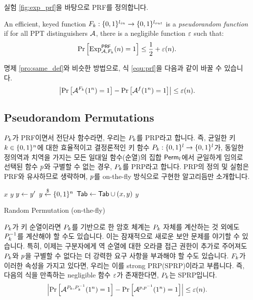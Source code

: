 실험 \ref{fig:exp_prf}을 바탕으로 PRF를 정의합니다.

\begin{definition} \label{def:prf}
  An efficient, keyed function
  $F_{k}: \{0, 1\}^{l_{in}} \to \{0, 1\}^{l_{out}}$ is a \emph{pseudorandom function} 
  if for all PPT distinguishers $\mathcal{A}$, there is a negligible function $\varepsilon$ 
  such that:
  \begin{equation}
    \text{Pr} \left[ \text{Exp}_{\mathcal{A}, F_{k}}^{\textsf{PRF}}(n) = 1 \right] \le \frac{1}{2} + \varepsilon(n).
    \label{equ:prf}
  \end{equation}
\end{definition}

명제 \ref{pro:same_def}와 비슷한 방법으로, 식 \ref{equ:prf}을 다음과 같이 바꿀 수 있습니다.
\begin{equation}
  \left| \text{Pr} \left[ \mathcal{A}^{F_{k}}(1^n) = 1 \right] - \text{Pr} \left[ \mathcal{A}^{f}(1^n) = 1 \right] \right| \le \varepsilon(n).
  \label{equ:prf2}
\end{equation}

\subsection*{Pseudorandom Permutations}
$P_{k}$가 PRF이면서 전단사 함수라면, 우리는 $P_{k}$를 PRP라고 합니다. 즉, 균일한 키 
$k \in \{0, 1\}^{n}$에 대한 효율적이고 결정론적인 키 함수 
$P_{k}: \{0, 1\}^{l} \to \{0, 1\}^{l}$가, 동일한 정의역과 치역을 가지는 모든 일대일
함수(순열)의 집합 $\textsf{Perm}_l$에서 균일하게 임의로 선택된 함수 $p$와 구별할 수 없는 경우, 
$P_{k}$를 PRP라고 합니다. PRP의 정의 및 실험은 PRF와 유사하므로 생략하며, $p$를 on-the-fly 
방식으로 구현한 알고리듬만 소개합니다.
\begin{algorithm}
  \begin{algorithmic}[1]
    \Require $x$
    \Ensure $y$
    \State $y \leftarrow y'$
    \State $y \overset{\$}\leftarrow \{0, 1\}^{n}$
    \EndWhile
    \State $\textsf{Tab} \leftarrow \textsf{Tab} \cup (x, y)$
    \EndIf
    \State \Return $y$
    \EndProcedure
  \end{algorithmic}
  \caption{Random Permutation (on-the-fly)}
  \label{alg:rp}
\end{algorithm}

$P_{k}$가 키 순열이라면 $P_{k}$를 기반으로 한 암호 체계는 $P_{k}$ 자체를 계산하는 것 외에도 
$P^{-1}_{k}$를 계산해야 할 수도 있습니다. 이는 잠재적으로 새로운 보안 문제를 야기할 수 있습니다. 
특히, 이제는 구분자에게 역 순열에 대한 오라클 접근 권한이 추가로 주어져도 $P_{k}$와 $p$을 구별할 수 
없다는 더 강력한 요구 사항을 부과해야 할 수도 있습니다. $F_{k}$가 이러한 속성을 가지고 있다면, 우리는 
이를 strong PRP(SPRP)이라고 부릅니다. 즉, 다음의 식을 만족하는 negligible 함수 $\varepsilon$가 
존재한다면, $P_{k}$는 SPRP입니다.
\begin{equation}
  \left| \text{Pr} \left[ \mathcal{A}^{P_{k}, P^{-1}_{k}}(1^n) = 1 \right] - \text{Pr} \left[ \mathcal{A}^{p, p^{-1}}(1^n) = 1 \right] \right|
  \le \varepsilon(n).
\end{equation}